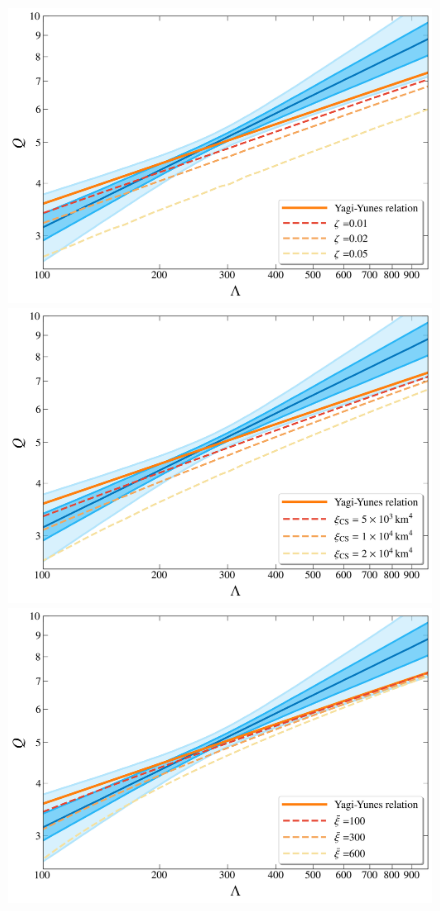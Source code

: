 \documentclass[a4paper,11pt]{article}
\begin{document}
\begin{figure}[htbp]
    \centering
    \begin{minipage}{0.48\linewidth}
        \includegraphics[width=\linewidth]{CS_zeta_AP4_2d.png}
    \end{minipage}
    \hfill
    \begin{minipage}{0.48\linewidth}
        \includegraphics[width=\linewidth]{CS_xi_cs_AP4_2d.png}
    \end{minipage}
    \vspace{3mm}
    \begin{minipage}{0.48\linewidth}
        \includegraphics[width=\linewidth]{CS_xi_bar_AP4_2d.png}

\end{minipage}
\end{figure}
\end{document}
